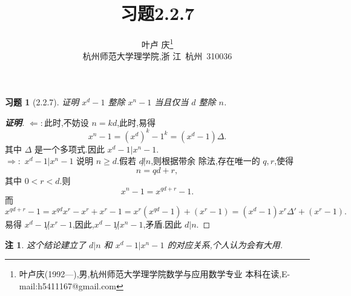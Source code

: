 \documentclass[twoside,11pt]{article}
\newtheorem{remark}{注}
\newtheorem*{exercise}{习题}
\begin{document}
\title{\huge{\bf{习题2.2.7}}} \author{\small{叶卢
    庆\footnote{叶卢庆(1992---),男,杭州师范大学理学院数学与应用数学专业
      本科在读,E-mail:h5411167@gmail.com}}\\{\small{杭州师范大学理学院,浙
      江~杭州~310036}}} \date{}
\maketitle



\vspace{30pt} %

\begin{exercise}[2.2.7]
  证明 $x^d-1$ 整除 $x^n-1$ 当且仅当 $d$ 整除 $n$.
\end{exercise}
\begin{proof}[\textbf{证明}]
$\Leftarrow:$此时,不妨设 $n=kd$,此时,易得
$$
x^n-1=(x^{d})^k-1^k=(x^d-1)\Delta.
$$
其中 $\Delta $ 是一个多项式.因此 $x^d-1|x^n-1$.\\

$\Rightarrow:$ $x^d-1|x^n-1$ 说明 $n\geq d$.假若 $d\not|n$,则根据带余
除法,存在唯一的 $q,r$,使得
$$
n=qd+r,
$$
其中 $0< r<d$.则
$$
x^n-1=x^{qd+r}-1.
$$
而
$$
x^{qd+r}-1=x^{qd}x^r-x^r+x^r-1=x^r(x^{qd}-1)+(x^r-1)=(x^d-1)x^r\Delta'+(x^r-1).
$$
易得 $x^d-1\not|x^r-1$,因此,$x^d-1\not |x^n-1$,矛盾.因此 $d|n$.
\end{proof}
\begin{remark}
  这个结论建立了 $d|n$ 和 $x^d-1|x^n-1$ 的对应关系,个人认为会有大用.
\end{remark}
% 
\end{document}
